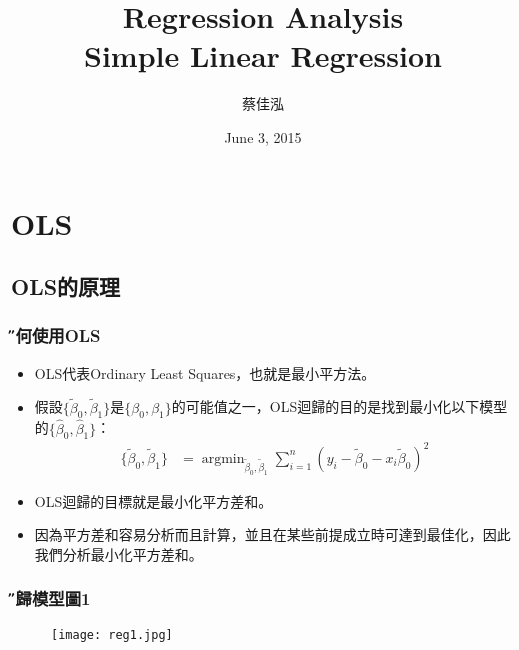 \documentclass[xcolor=dvipsnames]{beamer}
\author[蔡佳泓]{\K 蔡佳泓}
\title[Statistical Methods for Social Sciences]{Regression Analysis\\
\smallskip
{\small {Simple Linear Regression}}}
\date{June 3, 2015} %
\institute[ESC \& GIEAS]{\H 國立政治大學東亞所}
\DeclareMathOperator*{\argmin}{argmin}
\begin{document}
\maketitle
\tableofcontents
\section{OLS}
\subsection{OLS的原理}
\begin{frame} \frametitle{\H 為何使用OLS}
\begin{itemize}
\item OLS代表Ordinary Least Squares，也就是最小平方法。
\item 假設$ \{\tilde{\beta}_{0},\tilde{\beta}_{1}\} $是$ \{\beta_{0},\beta_{1}\} $的可能值之一，OLS迴歸的目的是找到最小化以下模型的$ \{\hat{\beta}_{0},\hat{\beta}_{1}\} $：
\medskip
\begin{align*}
 \{\tilde{\beta}_{0},\tilde{\beta}_{1}\}&=\argmin_{\tilde{\beta}_{0},\tilde{\beta}_{1}}\sum _{i=1}^n(y_{i}-\tilde{\beta}_{0}-x_{i}\tilde{\beta}_{0})^2 
 \end{align*}

\medskip
\item OLS迴歸的目標就是最小化平方差和。
\item 因為平方差和容易分析而且計算，並且在某些前提成立時可達到最佳化，因此我們分析最小化平方差和。
\end{itemize}
\end{frame}
\begin{frame}\frametitle{\H 迴歸模型圖1}
\begin{figure}
\begin{center}
\texttt{[image: reg1.jpg]}
\end{center}
\end{figure}
\end{frame}
\end{document}
